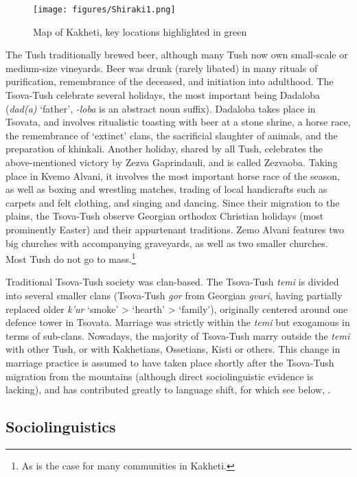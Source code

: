 \begin{figure}
	\texttt{[image: figures/Shiraki1.png]}
	\caption{Map of Kakheti, key locations highlighted in green}
	\label{map-shiraki}
\end{figure}

The Tush traditionally brewed beer, although many Tush now own small-scale or medium-size vineyards. Beer was drunk (rarely libated) in many rituals of purification, remembrance of the deceased, and initiation into adulthood. The Tsova-Tush celebrate several holidays, the most important being Dadaloba (\textit{dad(a)} `father', \textit{-loba} is an abstract noun suffix). Dadaloba takes place in Tsovata, and involves ritualistic toasting with beer at a stone shrine, a horse race, the remembrance of `extinct' clans, the sacrificial slaughter of animals, and the preparation of khinkali. Another holiday, shared by all Tush, celebrates the above-mentioned victory by Zezva Gaprindauli, and is called Zezvaoba. Taking place in Kvemo Alvani, it involves the most important horse race of the season, as well as boxing and wrestling matches, trading of local handicrafts such as carpets and felt clothing, and singing and dancing. Since their migration to the plains, the Tsova-Tush observe Georgian orthodox Christian holidays (most prominently Easter) and their appurtenant traditions. Zemo Alvani features two big churches with accompanying graveyards, as well as two smaller churches. Most Tush do not go to mass.\footnote{As is the case for many communities in Kakheti.}

Traditional Tsova-Tush society was clan-based. The Tsova-Tush \textit{temi} is divided into several smaller clans (Tsova-Tush \textit{gor} from Georgian \textit{gvari}, having partially replaced older \textit{k'ur} `smoke' > `hearth' > `family'), originally centered around one defence tower in Tsovata. Marriage was strictly within the \textit{temi} but exogamous in terms of sub-clans. Nowadays, the majority of Tsova-Tush marry outside the \textit{temi} with other Tush, or with Kakhetians, Ossetians, Kisti or others. This change in marriage practice is assumed to have taken place shortly after the Tsova-Tush migration from the mountains (although direct sociolinguistic evidence is lacking), and has contributed greatly to language shift, for which see below, .



\subsection{Sociolinguistics} \label{socioling}

